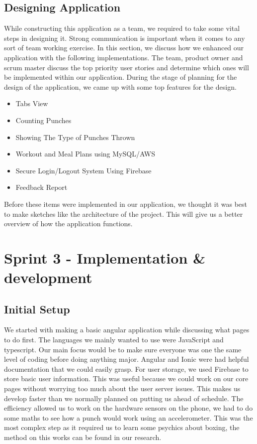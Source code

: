 \documentclass[a4paper,12pt]{report}
\begin{document}
\subsection{Designing Application}
While constructing this application as a team, we required to take some vital steps in designing it. Strong communication is important when it comes to any sort of team working exercise. In this section, we discuss how we enhanced our application with the following implementations.
\newline
The team, product owner and scrum master discuss the top priority user stories and determine which ones will be implemented within our application. During the stage of planning for the design of the application, we came up with some top features for the design.

\begin{itemize}
  \item Tabs View
  \item Counting Punches
  \item Showing The Type of Punches Thrown
  \item Workout and Meal Plans using MySQL/AWS
  \item Secure Login/Logout System Using Firebase
  \item Feedback Report
  \newline
\end{itemize}

Before these items were implemented in our application, we thought it was best to make sketches like the architecture of the project. This will give us a better overview of how the application functions.

\newpage
\section{Sprint 3 - Implementation \& development}
\subsection{Initial Setup}
We started with making a basic angular application while discussing what pages to do first. The languages we mainly wanted to use were JavaScript and typescript. Our main focus would be to make sure everyone was one the same level of coding before doing anything major. Angular and Ionic were had helpful documentation that we could easily grasp. For user storage, we used Firebase to store basic user information. This was useful because we could work on our core pages without worrying too much about the user server issues. This makes us develop faster than we normally planned on putting us ahead of schedule. The efficiency allowed us to work on the hardware sensors on the phone, we had to do some maths to see how a punch would work using an accelerometer. This was the most complex step as it required us to learn some psychics about boxing, the method on this works can be found in our research. 
\end{document}
